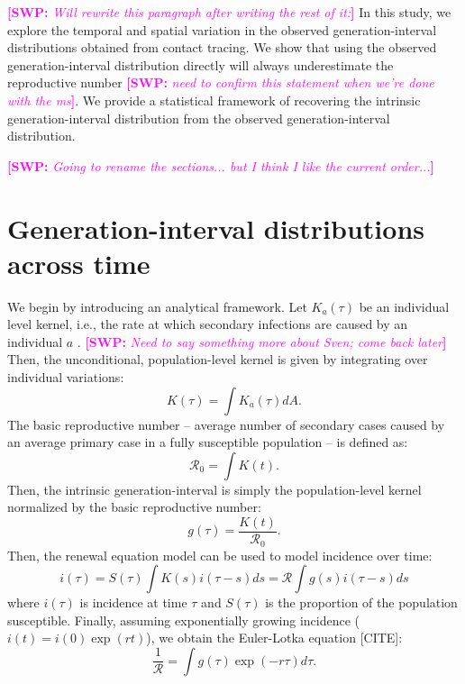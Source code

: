 \documentclass[12pt]{article}
\newcommand{\RR}{\ensuremath{{\mathcal R}}}
\newcommand{\comment}[3]{\textcolor{#1}{\textbf{[#2: }\textsl{#3}\textbf{]}}}
\newcommand{\swp}[1]{\comment{magenta}{SWP}{#1}}
\begin{document}
\swp{Will rewrite this paragraph after writing the rest of it:}
In this study, we explore the temporal and spatial variation in the observed generation-interval distributions obtained from contact tracing.
We show that using the observed generation-interval distribution directly will always underestimate the reproductive number \swp{need to confirm this statement when we're done with the ms}. 
We provide a statistical framework of recovering the intrinsic generation-interval distribution from the observed generation-interval distribution.

\swp{Going to rename the sections... but I think I like the current order...}
\section{Generation-interval distributions across time}

We begin by introducing an analytical framework.
Let $K_a(\tau)$ be an individual level kernel, i.e., the rate at which secondary infections are caused by an individual $a$ \citep{svensson2015influence}. \swp{Need to say something more about Sven; come back later}
Then, the unconditional, population-level kernel is given by integrating over individual variations:
\begin{equation}
K(\tau) = \int K_a (\tau) dA.
\end{equation}
The basic reproductive number -- average number of secondary cases caused by an average primary case in a fully susceptible population -- is defined as: 
\begin{equation}
\RR_0 = \int K(t).
\end{equation}
Then, the intrinsic generation-interval is simply the population-level kernel normalized by the basic reproductive number:
\begin{equation}
g(\tau) = \frac{K(t)}{\RR_0}.
\end{equation}
Then, the renewal equation model can be used to model incidence over time:
\begin{equation}
i(\tau) = S(\tau) \int K(s) i(\tau-s) ds = \RR \int g(s) i(\tau-s) ds
\end{equation}
where $i(\tau)$ is incidence at time $\tau$ and $S(\tau)$ is the proportion of the population susceptible.
Finally, assuming exponentially growing incidence ($i(t) = i(0) \exp(r t)$), we obtain the Euler-Lotka equation [CITE]:
\begin{equation}
\frac{1}{\RR} = \int g(\tau) \exp(-r \tau) d\tau.
\end{equation}
\end{document}
